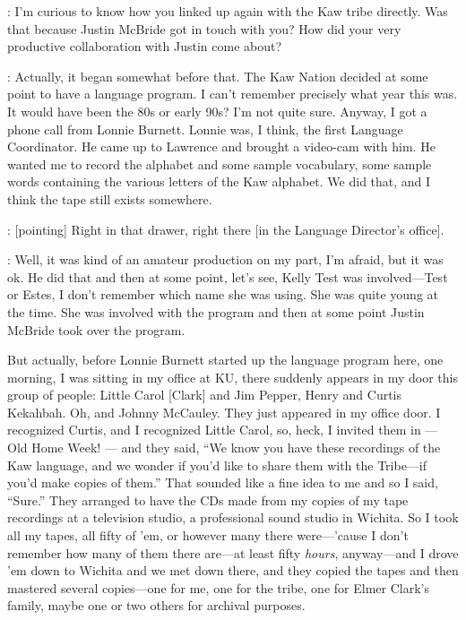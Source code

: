 \documentclass[output=paper]{LSP/langsci}
\begin{document}
: I'm curious to know how you linked up again with the Kaw tribe directly. Was that because Justin McBride got in touch with you? How did your very productive collaboration with Justin come about?

: Actually, it began somewhat before that. The Kaw Nation decided at some point to have a language program. I can't remember precisely what year this was. It would have been the 80s or early 90s? I'm not quite sure. Anyway, I got a phone call from Lonnie Burnett. Lonnie was, I think, the first Language Coordinator. He came up to Lawrence and brought a video-cam with him. He wanted me to record the alphabet and some sample vocabulary, some sample words containing the various letters of the Kaw alphabet. We did that, and I think the tape still exists somewhere.

: [pointing] Right in that drawer, right there [in the Language Director's office].

: Well, it was kind of an amateur production on my part, I'm afraid, but it was ok. He did that and then at some point, let's see, Kelly Test was involved---Test or Estes, I don't remember which name she was using. She was quite young at the time. She was involved with the program and then at some point Justin McBride took over the program. 

But actually, before Lonnie Burnett started up the language program here, one morning, I was sitting in my office at KU, there suddenly appears in my door this group of people: Little Carol [Clark] and Jim Pepper, Henry and Curtis Kekahbah. Oh, and Johnny McCauley. They just appeared in my office door. I recognized Curtis, and I recognized Little Carol, so, heck, I invited them in --- Old Home Week! --- and they said, ``We know you have these recordings of the Kaw language, and we wonder if you'd like to share them with the Tribe---if you'd make copies of them.'' That sounded like a fine idea to me and so I said, ``Sure.'' They arranged to have the CDs made from my copies of my tape recordings at a television studio, a professional sound studio in Wichita. So I took all my tapes, all fifty of 'em, or however many there were---'cause I don't remember how many of them there are---at least fifty \textit{hours}, anyway---and I drove 'em down to Wichita and we met down there, and they copied the tapes and then mastered several copies---one for me, one for the tribe, one for Elmer Clark's family, maybe one or two others for archival purposes. 
\end{document}
